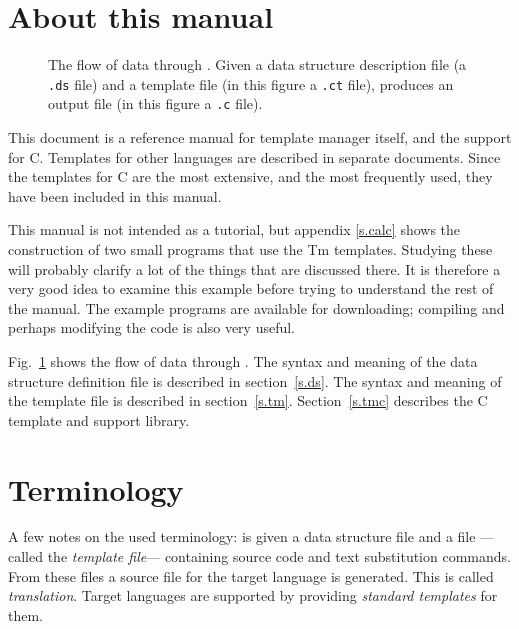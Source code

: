 \section{About this manual}
\begin{figure}
\begin{center}

\end{center}
\caption{\label{f.flow}The flow of data through {\Tm}.
Given a data structure description file (a \texttt{.ds} file) and
a template file (in this figure a \texttt{.ct} file), {\Tm} produces
an output file (in this figure a \texttt{.c} file).
}
\end{figure}
This document is a reference manual for template manager itself, and the
support for C. Templates for other languages are described in
separate documents. Since the templates for C are the most
extensive, and the most frequently used, they have been included
in this manual.
\par
This manual is not intended as a tutorial, but appendix \ref{s.calc}
shows the construction of two small programs that use the Tm templates.
Studying these will probably clarify a lot of the things that are
discussed there. It is therefore a very good idea to examine this example
before trying to understand the rest of the manual. The example programs
are available for downloading; compiling and perhaps modifying the code
is also very useful.
\par
Fig.~\ref{f.flow} shows the flow of data through {\Tm}. The syntax and
meaning of the data structure
definition file is described in section~\ref{s.ds}.
The syntax and meaning of the template file is described in
section~\ref{s.tm}.
Section~\ref{s.tmc} describes the C template and support library.
\section{Terminology}
A few notes on the used terminology:
{\Tm} is given a data structure file and a file
---called the \emph{template file}---
containing source code and text substitution commands.
From these files a source file for the target language is generated.
This is called \emph{translation}.
Target languages are supported by providing \emph{standard templates} \/for
them.
